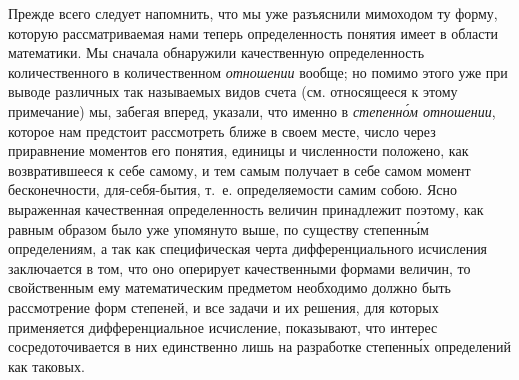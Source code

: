 Прежде всего следует напомнить, что мы уже разъяснили мимоходом ту форму,
которую рассматриваемая нами теперь определенность понятия имеет в области
математики. Мы сначала обнаружили качественную определенность количественного в
количественном {\em отношении} вообще; но помимо этого уже при выводе различных
так называемых видов счета (см. относящееся к этому примечание) мы, забегая
вперед, указали, что именно в {\em степенн\'{о}м отношении}, которое нам
предстоит рассмотреть ближе в своем месте, число через приравнение моментов его
понятия, единицы и численности положено, как возвратившееся к себе самому, и
тем самым получает в себе самом момент бесконечности, для-себя-бытия, т.~е.
определяемости самим собою. Ясно выраженная качественная определенность величин
принадлежит поэтому, как равным образом было уже упомянуто выше, по существу
степенн\'{ы}м определениям, а так как специфическая черта дифференциального
исчисления заключается в том, что оно оперирует качественными формами величин,
то свойственным ему математическим предметом необходимо должно быть
рассмотрение форм степеней, и все задачи и их решения, для которых применяется
дифференциальное исчисление, показывают, что интерес сосредоточивается в них
единственно лишь на разработке степенн\'{ы}х определений как таковых.

